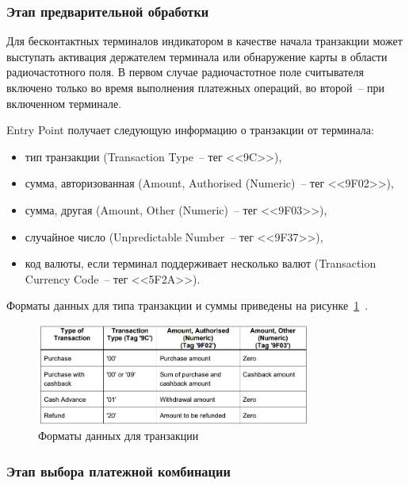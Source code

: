 \subsubsection{Этап предварительной обработки}
\label{subsubsec:pre-processing}

Для бесконтактных терминалов индикатором в качестве начала транзакции может выступать активация держателем терминала или обнаружение карты в области радиочастотного поля.
В первом случае радиочастотное поле считывателя включено только во время выполнения платежных операций, во второй~-- при включенном терминале.

Entry Point получает следующую информацию о транзакции от терминала:

\begin{itemize}
    \item тип транзакции (Transaction Type~-- тег <<9C>>),
    \item сумма, авторизованная (Amount, Authorised (Numeric)~-- тег <<9F02>>),
    \item сумма, другая (Amount, Other (Numeric)~-- тег <<9F03>>),
    \item случайное число (Unpredictable Number~-- тег <<9F37>>),
    \item код валюты, если терминал поддерживает несколько валют (Transaction Currency Code~-- тег <<5F2A>>).
\end{itemize}

Форматы данных для типа транзакции и суммы приведены на рисунке~\ref{fig:transaction_types}~\cite{emv_book_A}.

\begin{figure}[H]
    \centering
    \includegraphics[width=0.8\textwidth]{images/research/transaction_types}
    \caption{\centering Форматы данных для транзакции}
    \label{fig:transaction_types}
\end{figure}


\subsubsection{Этап выбора платежной комбинации}
\label{subsubsec:protocol_activation}

